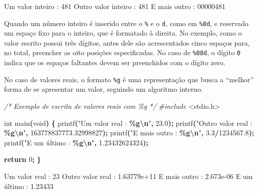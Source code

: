 \documentclass[
  11pt,
  a4paper,
]{scrbook}
\newenvironment{Shaded}{\begin{snugshade}}{\end{snugshade}}
\newcommand{\CommentTok}[1]{\textcolor[rgb]{0.56,0.35,0.01}{\textit{#1}}}
\newcommand{\ControlFlowTok}[1]{\textcolor[rgb]{0.13,0.29,0.53}{\textbf{#1}}}
\newcommand{\DataTypeTok}[1]{\textcolor[rgb]{0.13,0.29,0.53}{#1}}
\newcommand{\DecValTok}[1]{\textcolor[rgb]{0.00,0.00,0.81}{#1}}
\newcommand{\FloatTok}[1]{\textcolor[rgb]{0.00,0.00,0.81}{#1}}
\newcommand{\ImportTok}[1]{#1}
\newcommand{\NormalTok}[1]{#1}
\newcommand{\OperatorTok}[1]{\textcolor[rgb]{0.81,0.36,0.00}{\textbf{#1}}}
\newcommand{\PreprocessorTok}[1]{\textcolor[rgb]{0.56,0.35,0.01}{\textit{#1}}}
\newcommand{\SpecialCharTok}[1]{\textcolor[rgb]{0.81,0.36,0.00}{\textbf{#1}}}
\newcommand{\StringTok}[1]{\textcolor[rgb]{0.31,0.60,0.02}{#1}}
\begin{document}
\begin{Shaded}
\begin{Highlighting}[]
\NormalTok{Um valor inteiro    : 481}
\NormalTok{Outro valor inteiro :      481}
\NormalTok{E mais outro        : 00000481}
\end{Highlighting}
\end{Shaded}

Quando um número inteiro é inserido entre o \texttt{\%} e o \texttt{d},
como em \texttt{\%8d}, e reservado um espaço fixo para o inteiro, que é
formatado à direita. No exemplo, como o valor escrito possui três
dígitos, antes dele são acrescentados cinco espaços para, no total,
preencher as oito posições especificadas. No caso de \texttt{\%08d}, o
dígito \texttt{0} indica que os espaços faltantes devem ser preenchidos
com o dígito zero.

No caso de valores reais, o formato \texttt{\%g} é uma representação que
busca a ``melhor'' forma de se apresentar um valor, seguindo um
algoritmo interno.

\begin{Shaded}
\begin{Highlighting}[]
\CommentTok{/*}
\CommentTok{Exemplo de escrita de valores reais com \%g}
\CommentTok{*/}
\PreprocessorTok{\#include }\ImportTok{\textless{}stdio.h\textgreater{}}

\DataTypeTok{int}\NormalTok{ main}\OperatorTok{(}\DataTypeTok{void}\OperatorTok{)} \OperatorTok{\{}
\NormalTok{    printf}\OperatorTok{(}\StringTok{"Um valor real    : }\SpecialCharTok{\%g\textbackslash{}n}\StringTok{"}\OperatorTok{,} \FloatTok{23.0}\OperatorTok{);}
\NormalTok{    printf}\OperatorTok{(}\StringTok{"Outro valor real : }\SpecialCharTok{\%g\textbackslash{}n}\StringTok{"}\OperatorTok{,} \FloatTok{163778837773.32998827}\OperatorTok{);}
\NormalTok{    printf}\OperatorTok{(}\StringTok{"E mais outro     : }\SpecialCharTok{\%g\textbackslash{}n}\StringTok{"}\OperatorTok{,} \FloatTok{3.3}\OperatorTok{/}\FloatTok{1234567.8}\OperatorTok{);}
\NormalTok{    printf}\OperatorTok{(}\StringTok{"E um último      : }\SpecialCharTok{\%g\textbackslash{}n}\StringTok{"}\OperatorTok{,} \FloatTok{1.23432624324}\OperatorTok{);}

    \ControlFlowTok{return} \DecValTok{0}\OperatorTok{;}
\OperatorTok{\}}
\end{Highlighting}
\end{Shaded}

\begin{Shaded}
\begin{Highlighting}[]
\NormalTok{Um valor real    : 23}
\NormalTok{Outro valor real : 1.63779e+11}
\NormalTok{E mais outro     : 2.673e{-}06}
\NormalTok{E um último      : 1.23433}
\end{Highlighting}
\end{Shaded}
\end{document}
